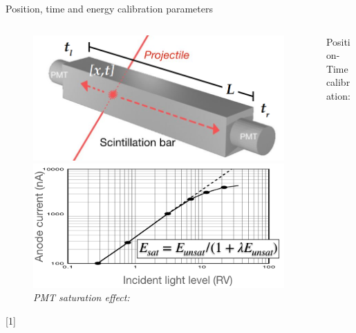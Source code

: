 \documentclass{ikpKoeln}
\begin{document}
\begin{frame}[t]{Position, time and energy calibration parameters}
	\vspace*{-1em}
	\begin{columns}
		\begin{column}{0.4 \textwidth}
			\begin{figure}[t]
				\centering
				\vspace*{-0.5em}
				\includegraphics[width = \textwidth]{R3BCon2024GSI/Bar.png}
				\captionsetup{singlelinecheck=off,font=footnotesize}
				\vspace*{0.5em}
				\caption*{\textit{PMT saturation effect\footnotemark:}}
				\vspace*{-1em}
				\includegraphics[width = \textwidth]{neuland/PMTSAT.png}
			\end{figure}
			\tiny{[1] }
		\end{column}
		\begin{column}{0.48 \textwidth}
			\vspace{-1.5em}
			\begin{block}{\small Position-Time calibration:}
				\footnotesize{
					\setlength{\abovedisplayskip}{0pt}
					\setlength{\belowdisplayskip}{0pt}
					\setlength{\abovedisplayshortskip}{0pt}
					\setlength{\belowdisplayshortskip}{0pt}
}
\end{block}
\end{column}
\end{columns}
\end{frame}
\end{document}
